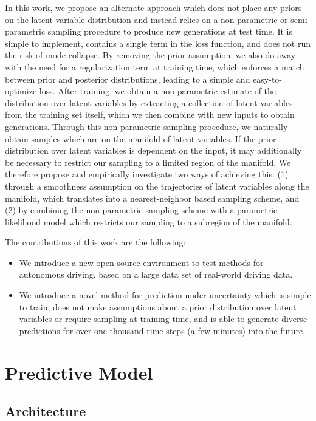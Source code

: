 \documentclass{article}
\begin{document}
In this work, we propose an alternate approach which does not place any priors on the latent variable distribution and instead relies on a non-parametric or semi-parametric sampling procedure to produce new generations at test time.
It is simple to implement, contains a single term in the loss function, and does not run the risk of mode collapse.
By removing the prior assumption, we also do away with the need for a regularization term at training time, which enforces a match between prior and posterior distributions, leading to a simple and easy-to-optimize loss.
After training, we obtain a non-parametric estimate of the distribution over latent variables by extracting a collection of latent variables from the training set itself, which we then combine with new inputs to obtain generations.
Through this non-parametric sampling procedure, we naturally obtain samples which are on the manifold of latent variables.
If the prior distribution over latent variables is dependent on the input, it may additionally be necessary to restrict our sampling to a limited region of the manifold.
We therefore propose and empirically investigate two ways of achieving this: (1) through a smoothness assumption on the trajectories of latent variables along the manifold, which translates into a nearest-neighbor based sampling scheme, and (2) by combining the non-parametric sampling scheme with a parametric likelihood model which restricts our sampling to a subregion of the manifold.

The contributions of this work are the following:
\begin{itemize}
\item We introduce a new open-source environment to test methods for autonomous driving, based on a large data set of real-world driving data.
\item We introduce a novel method for prediction under uncertainty which is simple to train, does not make assumptions about a prior distribution over latent variables or require sampling at training time, and is able to generate diverse predictions for over one thousand time steps (a few minutes) into the future.
\end{itemize}


\section{Predictive Model}

\subsection{Architecture}
\end{document}
